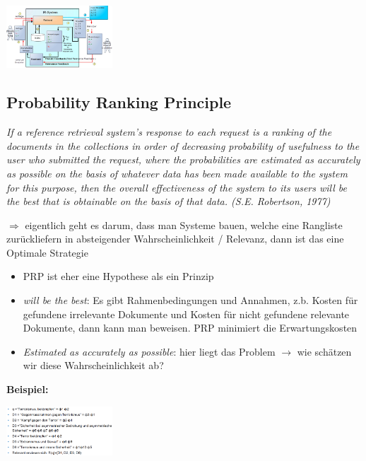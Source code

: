\documentclass{report}
\newenvironment{Figure}
	{\par\medskip\noindent\minipage{\linewidth}}
	{\endminipage\par\medskip}
\theoremstyle{definition}
\theoremstyle{example}
\begin{document}
\begin{Figure}
   \centering
    \includegraphics[width=150px]{img/schemaRelevanceFeedback.png}
        \label{fig:Schema von relevance Feedback Prozess}
\end{Figure}

\subsection{Probability Ranking Principle}
\textit{If a reference retrieval system's response to each request is a ranking of the
documents in the collections in order of decreasing probability of usefulness to
the user who submitted the request, where the probabilities are estimated as
accurately as possible on the basis of whatever data has been made available
to the system for this purpose, then the overall effectiveness of the system to
its users will be the best that is obtainable on the basis of that data. (S.E.
Robertson, 1977)}

$\Rightarrow$ eigentlich geht es darum, dass man Systeme bauen, welche eine Rangliste zurückliefern in absteigender Wahrscheinlichkeit / Relevanz, dann ist das eine Optimale Strategie

\begin{itemize}
   \item PRP ist eher eine Hypothese als ein Prinzip
   \item \textit{will be the best}: Es gibt Rahmenbedingungen und Annahmen, z.b. Kosten für gefundene irrelevante Dokumente und Kosten für nicht gefundene relevante Dokumente, dann kann man beweisen. PRP minimiert die Erwartungskosten
   \item \textit{Estimated as accurately as possible}: hier liegt das Problem $\rightarrow$ wie schätzen wir diese Wahrscheinlichkeit ab?
\end{itemize}

\textbf{Beispiel:}
\begin{Figure}
   \centering
    \includegraphics[width=150px]{img/BeispielPRP.png}
        \label{fig:Beispiel eines PRP}
\end{Figure}
\end{document}
